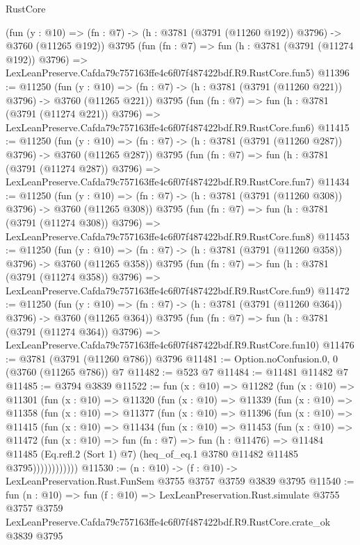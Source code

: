 \begin{lexlean}{RustCore}
\begin{coremodule}
    (fun (y : @10) => (fn : @7) -> (h : @3781 (@3791 (@11260 @192)) @3796) -> @3760 (@11265 @192))
    @3795
    (fun (fn : @7) =>
    fun (h : @3781 (@3791 (@11274 @192)) @3796) =>
    LexLeanPreserve.Cafda79c757163ffe4c6f07f487422bdf.R9.RustCore.fun5)
@11396 := @11250
    (fun (y : @10) => (fn : @7) -> (h : @3781 (@3791 (@11260 @221)) @3796) -> @3760 (@11265 @221))
    @3795
    (fun (fn : @7) =>
    fun (h : @3781 (@3791 (@11274 @221)) @3796) =>
    LexLeanPreserve.Cafda79c757163ffe4c6f07f487422bdf.R9.RustCore.fun6)
@11415 := @11250
    (fun (y : @10) => (fn : @7) -> (h : @3781 (@3791 (@11260 @287)) @3796) -> @3760 (@11265 @287))
    @3795
    (fun (fn : @7) =>
    fun (h : @3781 (@3791 (@11274 @287)) @3796) =>
    LexLeanPreserve.Cafda79c757163ffe4c6f07f487422bdf.R9.RustCore.fun7)
@11434 := @11250
    (fun (y : @10) => (fn : @7) -> (h : @3781 (@3791 (@11260 @308)) @3796) -> @3760 (@11265 @308))
    @3795
    (fun (fn : @7) =>
    fun (h : @3781 (@3791 (@11274 @308)) @3796) =>
    LexLeanPreserve.Cafda79c757163ffe4c6f07f487422bdf.R9.RustCore.fun8)
@11453 := @11250
    (fun (y : @10) => (fn : @7) -> (h : @3781 (@3791 (@11260 @358)) @3796) -> @3760 (@11265 @358))
    @3795
    (fun (fn : @7) =>
    fun (h : @3781 (@3791 (@11274 @358)) @3796) =>
    LexLeanPreserve.Cafda79c757163ffe4c6f07f487422bdf.R9.RustCore.fun9)
@11472 := @11250
    (fun (y : @10) => (fn : @7) -> (h : @3781 (@3791 (@11260 @364)) @3796) -> @3760 (@11265 @364))
    @3795
    (fun (fn : @7) =>
    fun (h : @3781 (@3791 (@11274 @364)) @3796) =>
    LexLeanPreserve.Cafda79c757163ffe4c6f07f487422bdf.R9.RustCore.fun10)
@11476 := @3781 (@3791 (@11260 @786)) @3796
@11481 := Option.noConfusion.{0, 0} (@3760 (@11265 @786)) @7
@11482 := @523 @7
@11484 := @11481 @11482 @7
@11485 := @3794 @3839
@11522 := fun (x : @10) =>
  @11282
    (fun (x : @10) =>
    @11301
      (fun (x : @10) =>
      @11320
        (fun (x : @10) =>
        @11339
          (fun (x : @10) =>
          @11358
            (fun (x : @10) =>
            @11377
              (fun (x : @10) =>
              @11396
                (fun (x : @10) =>
                @11415
                  (fun (x : @10) =>
                  @11434
                    (fun (x : @10) =>
                    @11453
                      (fun (x : @10) =>
                      @11472
                        (fun (x : @10) =>
                        fun (fn : @7) =>
                        fun (h : @11476) =>
                        @11484
                          @11485
                          (Eq.refl.{2} (Sort 1) @7)
                          (heq_of_eq.{1} @3780 @11482 @11485 @3795))))))))))))
@11530 := (n : @10) -> (f : @10) -> LexLeanPreservation.Rust.FunSem @3755 @3757 @3759 @3839 @3795
@11540 := fun (n : @10) =>
  fun (f : @10) =>
  LexLeanPreservation.Rust.simulate
    @3755
    @3757
    @3759
    LexLeanPreserve.Cafda79c757163ffe4c6f07f487422bdf.R9.RustCore.crate_ok
    @3839
    @3795
\end{coremodule}
\end{lexlean}
